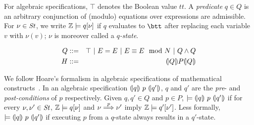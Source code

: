 For algebraic specifications, $\top$ denotes the Boolean value
$\mathit{tt}$. A \emph{predicate} $q \in Q$ is an arbitrary
conjunction of (modulo) equations over expressions are admissible. For
$\nu \in \mathit{St}$, we write $\mathbb{Z} \models q[\nu]$ if $q$
evaluates to $\btt$ after replacing each variable $v$ with
$\nu(v)$; $\nu$ is moreover called a \emph{$q$-state}.

\begin{eqnarray*}
  Q & ::= & \top
     \ |\   E = E
     \ |\   E \equiv E \mod N
     \ |\   Q \wedge Q\\
  H & ::= & {(\!|}{Q}{|\!)} P {(\!|}{Q}{|\!)}
\end{eqnarray*}

We follow Hoare's formalism in algebraic specifications of
mathematical constructs~\cite{H:69:ABCP}. In an algebraic
specification ${(\!|}{q}{|\!)}~{p}~{(\!|}{q'}{|\!)}$, $q$ and $q'$ are the \emph{pre}- and
\emph{post-conditions} of $p$ respectively. Given $q, q' \in Q$ and $p
\in P$, $\models {(\!|}{q}{|\!)}~{p}~{(\!|}{q'}{|\!)}$ if for every $\nu, \nu' \in
\mathit{St}$, $\mathbb{Z} \models q[\nu]$ and $\nu \overset{p}{\Longrightarrow} \nu'$ imply
$\mathbb{Z} \models q'[\nu']$. Less formally, $\models
{(\!|}{q}{|\!)}~{p}~{(\!|}{q'}{|\!)}$ if executing $p$ from a $q$-state always
results in a $q'$-state.


